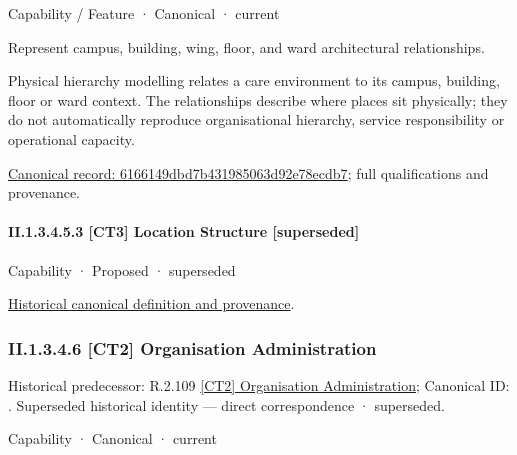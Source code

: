 \label{element:6166149dbd7b431985063d92e78ecdb7}
{\small Capability / Feature · Canonical · current}\par

Represent campus, building, wing, floor, and ward architectural relationships.



Physical hierarchy modelling relates a care environment to its campus, building, floor or ward context. The relationships describe where places sit physically; they do not automatically reproduce organisational hierarchy, service responsibility or operational capacity.


{\footnotesize \href{../../../../continuum/strategy/capability/feature/6166149dbd7b431985063d92e78ecdb7.md}{Canonical record: 6166149dbd7b431985063d92e78ecdb7}; full qualifications and provenance.}\par
\paragraph*{II.1.3.4.5.3 [CT3] Location Structure [superseded]}
\label{navigation:II.1.3.4.5.3}

\label{element:2436c87195334daf85ed4e2de4ec4bd5}
{\small Capability · Proposed · superseded}\par
\href{../../../../continuum/strategy/capability/2436c87195334daf85ed4e2de4ec4bd5.md}{Historical canonical definition and provenance}.\par
\subsubsection*{II.1.3.4.6 [CT2] Organisation Administration}
\label{navigation:II.1.3.4.6}

{\small Historical predecessor: R.2.109 \hyperref[element:1b0eacfbb27d4631a24f9279dab6681d]{[CT2] Organisation Administration}; Canonical ID: \texttt{}. Superseded historical identity — direct correspondence · superseded.}\par
\label{element:14fbdc5ce3dd4c2092c5397dab3ed743}
{\small Capability · Canonical · current}\par

